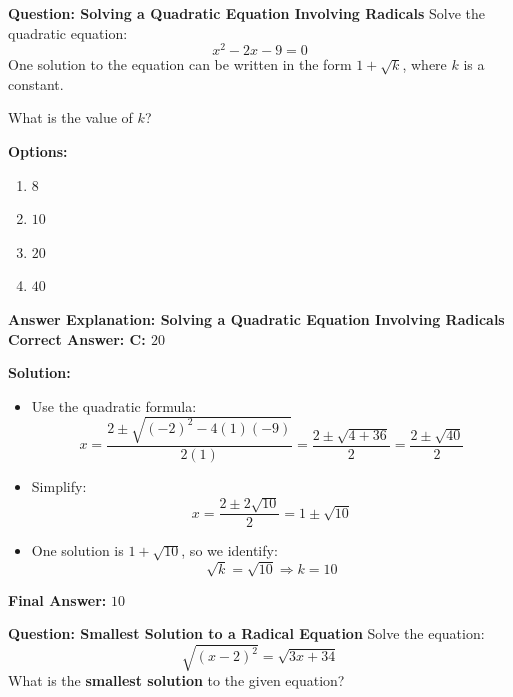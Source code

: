 \documentclass{beamer}
\begin{document}
\begin{frame}{\textbf{Question: Solving a Quadratic Equation Involving Radicals}}
    Solve the quadratic equation:
    \[
    x^2 - 2x - 9 = 0
    \]
    One solution to the equation can be written in the form \(1 + \sqrt{k}\), where \(k\) is a constant.

    \vspace{0.3cm}
    What is the value of \(k\)?

    \vspace{0.5cm}
    \textbf{Options:}
    \begin{enumerate}
        \item[A] \(8\)
        \item[B] \(10\)
        \item[C] \(20\)
        \item[D] \(40\)
    \end{enumerate}
\end{frame}

\begin{frame}{\textbf{Answer Explanation: Solving a Quadratic Equation Involving Radicals}}
    \textbf{Correct Answer: \textcolor{novelGreen}{C: \(20\)}}

    \vspace{0.3cm}
    \textbf{Solution:}
    \begin{itemize}
        \item Use the quadratic formula:
        \[
        x = \frac{2 \pm \sqrt{(-2)^2 - 4(1)(-9)}}{2(1)} = \frac{2 \pm \sqrt{4 + 36}}{2} = \frac{2 \pm \sqrt{40}}{2}
        \]
        \item Simplify:
        \[
        x = \frac{2 \pm 2\sqrt{10}}{2} = 1 \pm \sqrt{10}
        \]
        \item One solution is \(1 + \sqrt{10}\), so we identify:
        \[
        \sqrt{k} = \sqrt{10} \Rightarrow k = 10
        \]
    \end{itemize}

    \textbf{Final Answer:} \( \boxed{10} \)
\end{frame}



\begin{frame}{\textbf{Question: Smallest Solution to a Radical Equation}}
Solve the equation:
\[
\sqrt{(x - 2)^2} = \sqrt{3x + 34}
\]
What is the \textbf{smallest solution} to the given equation?
\end{frame}
\end{document}
